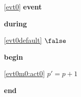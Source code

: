 \noindent \ref{evt0}  \textbf{event}
\begin{block}
\item \textbf{during}
\begin{block}
\item[ \eqref{evt0default} ]$\false $ %
\end{block}
\item \textbf{begin}
\begin{block}
\item[ \eqref{evt0m0:act0} ]$p' = p + 1 $ %
\end{block}
\item \textbf{end} \\
\end{block}
